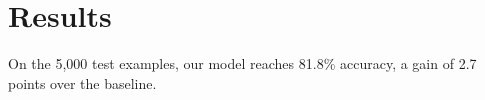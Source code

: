 \documentclass{article}
\providecommand{\src}[1]{}      %
\begin{document}
\section{Results}
On the 5,000\src{n_test} test examples, our model reaches 81.8\%\src{acc} accuracy,
a gain of 2.7\src{gain} points over the baseline.
\end{document}
